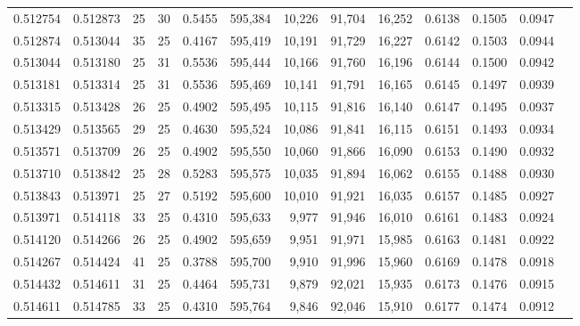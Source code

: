 \begin{tabular}{rrrrrrrrrrrrr}
0.512754 & 0.512873 &    25 &  30 &                                     0.5455 & 595,384 &  10,226 &  91,704 &  16,252 & 0.6138 & 0.1505 & 0.0947 \\
0.512874 & 0.513044 &    35 &  25 &                                     0.4167 & 595,419 &  10,191 &  91,729 &  16,227 & 0.6142 & 0.1503 & 0.0944 \\
0.513044 & 0.513180 &    25 &  31 &                                     0.5536 & 595,444 &  10,166 &  91,760 &  16,196 & 0.6144 & 0.1500 & 0.0942 \\
0.513181 & 0.513314 &    25 &  31 &                                     0.5536 & 595,469 &  10,141 &  91,791 &  16,165 & 0.6145 & 0.1497 & 0.0939 \\
0.513315 & 0.513428 &    26 &  25 &                                     0.4902 & 595,495 &  10,115 &  91,816 &  16,140 & 0.6147 & 0.1495 & 0.0937 \\
0.513429 & 0.513565 &    29 &  25 &                                     0.4630 & 595,524 &  10,086 &  91,841 &  16,115 & 0.6151 & 0.1493 & 0.0934 \\
0.513571 & 0.513709 &    26 &  25 &                                     0.4902 & 595,550 &  10,060 &  91,866 &  16,090 & 0.6153 & 0.1490 & 0.0932 \\
0.513710 & 0.513842 &    25 &  28 &                                     0.5283 & 595,575 &  10,035 &  91,894 &  16,062 & 0.6155 & 0.1488 & 0.0930 \\
0.513843 & 0.513971 &    25 &  27 &                                     0.5192 & 595,600 &  10,010 &  91,921 &  16,035 & 0.6157 & 0.1485 & 0.0927 \\
0.513971 & 0.514118 &    33 &  25 &                                     0.4310 & 595,633 &   9,977 &  91,946 &  16,010 & 0.6161 & 0.1483 & 0.0924 \\
0.514120 & 0.514266 &    26 &  25 &                                     0.4902 & 595,659 &   9,951 &  91,971 &  15,985 & 0.6163 & 0.1481 & 0.0922 \\
0.514267 & 0.514424 &    41 &  25 &                                     0.3788 & 595,700 &   9,910 &  91,996 &  15,960 & 0.6169 & 0.1478 & 0.0918 \\
0.514432 & 0.514611 &    31 &  25 &                                     0.4464 & 595,731 &   9,879 &  92,021 &  15,935 & 0.6173 & 0.1476 & 0.0915 \\
0.514611 & 0.514785 &    33 &  25 &                                     0.4310 & 595,764 &   9,846 &  92,046 &  15,910 & 0.6177 & 0.1474 & 0.0912 \\

\end{tabular}
